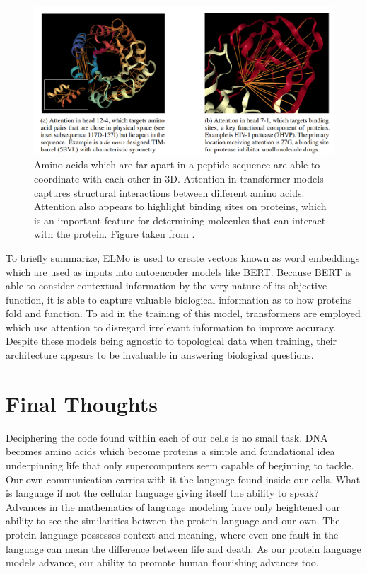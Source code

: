 \documentclass{SBCbookchapter}
\begin{document}
\begin{figure}[h!]
	\centerline{\includegraphics[scale=0.7]{rob_long_4.png}}
	\caption{Amino acids which are far apart in a peptide sequence are able to coordinate with each other in 3D. Attention in transformer models captures structural interactions between different 
amino acids. Attention also appears to highlight binding sites on proteins, which is an important feature for determining molecules that can interact with the protein. Figure taken from 
\cite{vig_bertology_2020}. }
	\label{figfour}
\end{figure}

To briefly summarize, ELMo is used to create vectors known as word embeddings which are used as inputs into autoencoder models like BERT. Because BERT is able to consider contextual information by the 
very nature of its objective function, it is able to capture valuable biological information as to how proteins fold and function. To aid in the training of this model, transformers are employed which 
use attention to disregard irrelevant information to improve accuracy. Despite these models being agnostic to topological data when training, their architecture appears to be invaluable in answering 
biological questions.  

\section{Final Thoughts}

Deciphering the code found within each of our cells is no small task. DNA becomes amino acids which become proteins \textemdash a simple and foundational idea underpinning life that only supercomputers 
seem capable of beginning to tackle. Our own communication carries with it the language found inside our cells. What is language if not the cellular language giving itself the ability to speak? Advances 
in the mathematics of language modeling have only heightened our ability to see the similarities between the protein language and our own. The protein language possesses context and meaning, where even 
one fault in the language can mean the difference between life and death. As our protein language models advance, our ability to promote human flourishing advances too. 
\end{document}
